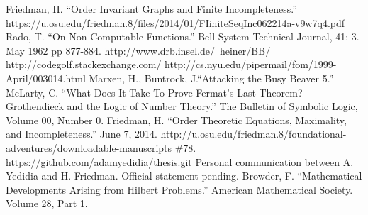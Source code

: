 \begin{thebibliography}{100}
 Friedman, H. ``Order Invariant Graphs and Finite Incompleteness.'' https://u.osu.edu/friedman.8/files/2014/01/FIiniteSeqInc062214a-v9w7q4.pdf
 Rado, T. ``On Non-Computable Functions.'' 
Bell System Technical Journal, 41: 3. May 1962 pp 877-884.
 http://www.drb.insel.de/~heiner/BB/
 http://codegolf.stackexchange.com/
 http://cs.nyu.edu/pipermail/fom/1999-April/003014.html
 Marxen, H., Buntrock, J.``Attacking the Busy Beaver 5.'' 
 McLarty, C. ``What Does It Take To Prove Fermat's Last Theorem? Grothendieck and the Logic of Number Theory.'' The Bulletin of Symbolic Logic, Volume 00, Number 0.
 Friedman, H. ``Order Theoretic Equations, Maximality, and Incompleteness.'' June 7, 2014. http://u.osu.edu/friedman.8/foundational-adventures/downloadable-manuscripts \#78.
 https://github.com/adamyedidia/thesis.git
 Personal communication between A. Yedidia and H. Friedman. Official statement pending.
 Browder, F. ``Mathematical Developments Arising from Hilbert Problems.'' American Mathematical Society. Volume 28, Part 1.
\end{thebibliography}


